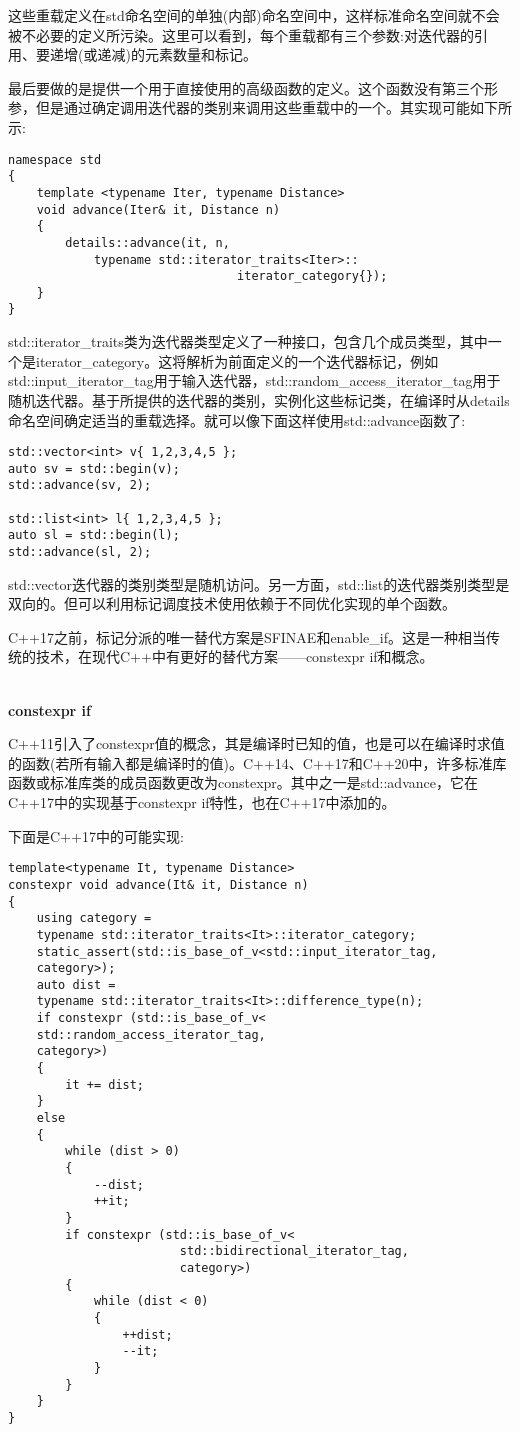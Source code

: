 这些重载定义在std命名空间的单独(内部)命名空间中，这样标准命名空间就不会被不必要的定义所污染。这里可以看到，每个重载都有三个参数:对迭代器的引用、要递增(或递减)的元素数量和标记。

最后要做的是提供一个用于直接使用的高级函数的定义。这个函数没有第三个形参，但是通过确定调用迭代器的类别来调用这些重载中的一个。其实现可能如下所示:

\begin{lstlisting}[style=styleCXX]
namespace std
{
	template <typename Iter, typename Distance>
	void advance(Iter& it, Distance n)
	{
		details::advance(it, n,
			typename std::iterator_traits<Iter>::
								iterator_category{});
	}
}
\end{lstlisting}

std::iterator\_traits类为迭代器类型定义了一种接口，包含几个成员类型，其中一个是iterator\_category。这将解析为前面定义的一个迭代器标记，例如std::input\_iterator\_tag用于输入迭代器，std::random\_access\_iterator\_tag用于随机迭代器。基于所提供的迭代器的类别，实例化这些标记类，在编译时从details命名空间确定适当的重载选择。就可以像下面这样使用std::advance函数了:

\begin{lstlisting}[style=styleCXX]
std::vector<int> v{ 1,2,3,4,5 };
auto sv = std::begin(v);
std::advance(sv, 2);

std::list<int> l{ 1,2,3,4,5 };
auto sl = std::begin(l);
std::advance(sl, 2);
\end{lstlisting}

std::vector迭代器的类别类型是随机访问。另一方面，std::list的迭代器类别类型是双向的。但可以利用标记调度技术使用依赖于不同优化实现的单个函数。


C++17之前，标记分派的唯一替代方案是SFINAE和enable\_if。这是一种相当传统的技术，在现代C++中有更好的替代方案——constexpr if和概念。

\noindent
\hspace*{\fill} \\ %
\textbf{constexpr if}

C++11引入了constexpr值的概念，其是编译时已知的值，也是可以在编译时求值的函数(若所有输入都是编译时的值)。C++14、C++17和C++20中，许多标准库函数或标准库类的成员函数更改为constexpr。其中之一是std::advance，它在C++17中的实现基于constexpr if特性，也在C++17中添加的。

下面是C++17中的可能实现:

\begin{lstlisting}[style=styleCXX]
template<typename It, typename Distance>
constexpr void advance(It& it, Distance n)
{
	using category =
	typename std::iterator_traits<It>::iterator_category;
	static_assert(std::is_base_of_v<std::input_iterator_tag,
	category>);
	auto dist =
	typename std::iterator_traits<It>::difference_type(n);
	if constexpr (std::is_base_of_v<
	std::random_access_iterator_tag,
	category>)
	{
		it += dist;
	}
	else
	{
		while (dist > 0)
		{
			--dist;
			++it;
		}
		if constexpr (std::is_base_of_v<
						std::bidirectional_iterator_tag,
						category>)
		{
			while (dist < 0)
			{
				++dist;
				--it;
			}
		}
	}
}
\end{lstlisting}

